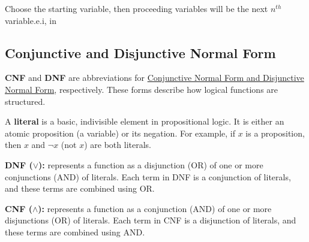  Choose the starting variable, then proceeding variables will be the next $n^{th}$ variable.e.i, in 


\subsection{Conjunctive and Disjunctive Normal Form}
\textbf{CNF} and \textbf{DNF} are abbreviations for \underline{Conjunctive Normal Form and Disjunctive Normal Form}, respectively. These forms describe how logical functions are structured.\\

\begin{note}
    A \textbf{literal} is a basic, indivisible element in propositional logic. It is either an atomic proposition (a variable) or its negation. For example, if $x$ is a proposition, then $x$ and $\neg x$ (not $x$) are both literals.
\end{note}

\begin{definition}
    \textbf{DNF ($\lor$):} represents a function as a disjunction (OR) of one or more conjunctions (AND) of literals. Each term in DNF is a conjunction of literals, and these terms are combined using OR.\\
\end{definition}
\begin{definition}
    \textbf{CNF ($\land$): } represents a function as a conjunction (AND) of one or more disjunctions (OR) of literals. Each term in CNF is a disjunction of literals, and these terms are combined using AND.\\
\end{definition}


